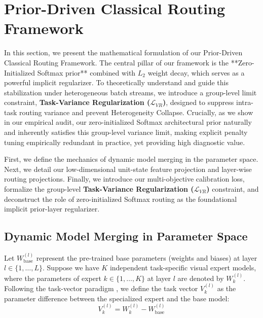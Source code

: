\section{Prior-Driven Classical Routing Framework}
\label{sec:method}

In this section, we present the mathematical formulation of our Prior-Driven Classical Routing Framework. The central pillar of our framework is the **Zero-Initialized Softmax prior** combined with $L_2$ weight decay, which serves as a powerful implicit regularizer. To theoretically understand and guide this stabilization under heterogeneous batch streams, we introduce a group-level limit constraint, \textbf{Task-Variance Regularization ($\mathcal{L}_{VR}$)}, designed to suppress intra-task routing variance and prevent Heterogeneity Collapse. Crucially, as we show in our empirical audit, our zero-initialized Softmax architectural prior naturally and inherently satisfies this group-level variance limit, making explicit penalty tuning empirically redundant in practice, yet providing high diagnostic value. 

First, we define the mechanics of dynamic model merging in the parameter space. Next, we detail our low-dimensional unit-state feature projection and layer-wise routing projections. Finally, we introduce our multi-objective calibration loss, formalize the group-level \textbf{Task-Variance Regularization ($\mathcal{L}_{VR}$)} constraint, and deconstruct the role of zero-initialized Softmax routing as the foundational implicit prior-layer regularizer.

\subsection{Dynamic Model Merging in Parameter Space}
Let $W_{\text{base}}^{(l)}$ represent the pre-trained base parameters (weights and biases) at layer $l \in \{1, \dots, L\}$. Suppose we have $K$ independent task-specific visual expert models, where the parameters of expert $k \in \{1, \dots, K\}$ at layer $l$ are denoted by $W_k^{(l)}$. Following the task-vector paradigm \cite{ilharco2022editing}, we define the task vector $V_k^{(l)}$ as the parameter difference between the specialized expert and the base model:
\begin{equation}
    V_k^{(l)} = W_k^{(l)} - W_{\text{base}}^{(l)}
\end{equation}

